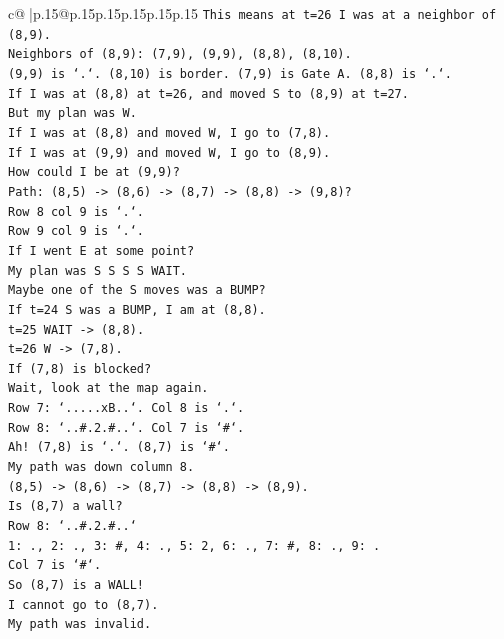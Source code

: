 \documentclass{article}
\begin{document}
{\begin{supertabular}{c@{$\;$}|p{.15\linewidth}@{}p{.15\linewidth}p{.15\linewidth}p{.15\linewidth}p{.15\linewidth}p{.15\linewidth}}
{{{\texttt{This means at t=26 I was at a neighbor of (8,9).} \\
\texttt{Neighbors of (8,9): (7,9), (9,9), (8,8), (8,10).} \\
\texttt{(9,9) is `.`. (8,10) is border. (7,9) is Gate A. (8,8) is `.`.} \\
\texttt{If I was at (8,8) at t=26, and moved S to (8,9) at t=27.} \\
\texttt{But my plan was W.} \\
\texttt{If I was at (8,8) and moved W, I go to (7,8).} \\
\texttt{If I was at (9,9) and moved W, I go to (8,9).} \\
\texttt{How could I be at (9,9)?} \\
\texttt{Path: (8,5) {-}> (8,6) {-}> (8,7) {-}> (8,8) {-}> (9,8)?} \\
\texttt{Row 8 col 9 is `.`.} \\
\texttt{Row 9 col 9 is `.`.} \\
\texttt{If I went E at some point?} \\
\texttt{My plan was S S S S WAIT.} \\
\texttt{Maybe one of the S moves was a BUMP?} \\
\texttt{If t=24 S was a BUMP, I am at (8,8).} \\
\texttt{t=25 WAIT {-}> (8,8).} \\
\texttt{t=26 W {-}> (7,8).} \\
\texttt{If (7,8) is blocked?} \\
\texttt{Wait, look at the map again.} \\
\texttt{Row 7: `.....xB..`. Col 8 is `.`.} \\
\texttt{Row 8: `..\#.2.\#..`. Col 7 is `\#`.} \\
\texttt{Ah! (7,8) is `.`. (8,7) is `\#`.} \\
\texttt{My path was down column 8.} \\
\texttt{(8,5) {-}> (8,6) {-}> (8,7) {-}> (8,8) {-}> (8,9).} \\
\texttt{Is (8,7) a wall?} \\
\texttt{Row 8: `..\#.2.\#..`} \\
\texttt{1: ., 2: ., 3: \#, 4: ., 5: 2, 6: ., 7: \#, 8: ., 9: .} \\
\texttt{Col 7 is `\#`.} \\
\texttt{So (8,7) is a WALL!} \\
\texttt{I cannot go to (8,7).} \\
\texttt{My path was invalid.} \\
}}}
\end{supertabular}}
\end{document}
